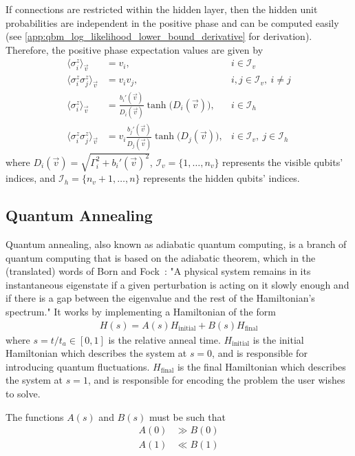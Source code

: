If connections are restricted within the hidden layer, then the hidden unit probabilities are independent in the positive phase and can be computed easily (see \cref{app:qbm_log_likelihood_lower_bound_derivative} for derivation).
Therefore, the positive phase expectation values are given by
\begin{align}
    \langle \sigma_i^z \rangle_\vec{v}
        &= v_i,
        & i \in \mathcal{I}_v \\
    \langle \sigma_i^z \sigma_j^z \rangle_{\vec{v}}
        &= v_i v_j,
        & i, j \in \mathcal{I}_v, \ i \ne j \\
    \langle \sigma_i^z \rangle_\vec{v}
        &= \frac{b_i'(\vec{v})}{D_i(\vec{v})} \tanh\big(D_i(\vec{v})\big),
        & i \in \mathcal{I}_h \\
    \langle \sigma_i^z \sigma_j^z \rangle_{\vec{v}}
        &= v_i \frac{b_j'(\vec{v})}{D_j(\vec{v})} \tanh\big(D_j(\vec{v})\big),
        & i \in \mathcal{I}_v, \ j \in \mathcal{I}_h
\end{align}
where \( D_i(\vec{v}) = \sqrt{\Gamma_i^2 + b_i'(\vec{v})^2} \), \( \mathcal{I}_v = \{1, \dots, n_v\} \) represents the visible qubits' indices, and \( \mathcal{I}_h = \{n_v + 1, \dots, n\} \) represents the hidden qubits' indices.

\subsection{Quantum Annealing}
Quantum annealing, also known as adiabatic quantum computing, is a branch of quantum computing that is based on the adiabatic theorem, which in the (translated) words of Born and Fock~\cite{born_fock_1928}:
"A physical system remains in its instantaneous eigenstate if a given perturbation is acting on it slowly enough and if there is a gap between the eigenvalue and the rest of the Hamiltonian's spectrum."
It works by implementing a Hamiltonian of the form~\cite{qc_lecture_notes}
\begin{align}
    H(s) = A(s) H_{\text{initial}} + B(s) H_{\text{final}}
\end{align}
where \( s = t / t_a \in [0, 1] \) is the relative anneal time.
\( H_{\text{initial}} \) is the initial Hamiltonian which describes the system at \( s = 0 \), and is responsible for introducing quantum fluctuations.
\( H_{\text{final}} \) is the final Hamiltonian which describes the system at \( s = 1 \), and is responsible for encoding the problem the user wishes to solve.

The functions \( A(s) \) and \( B(s) \) must be such that
\begin{align}
    A(0) &\gg B(0) \\
    A(1) &\ll B(1)
\end{align}

